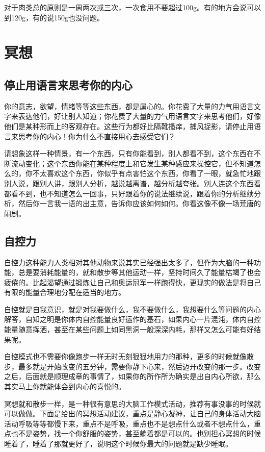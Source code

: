 \documentclass[12pt,oneside]{book}
\begin{document}
对于肉类总的原则是一周两次或三次，一次食用不要超过100g。有的地方会说可以到120g，有的说150g也没问题。


\chapter{冥想}
\section{停止用语言来思考你的内心}
你的意志，欲望，情绪等等这些东西，都是属心的。你花费了大量的力气用语言文字来表达他们，好让别人知道；你花费了大量的力气用语言文字来思考他们，好像他们是某种形而上的客观存在。这些行为都好比隔靴搔痒，捕风捉影，请停止用语言来思考你的内心！你为什么不直接用心去感受它们？

请想象这样一种情景，有一个东西，只有你能看到，别人都看不到，这个东西在不断流动变化；这个东西你能在某种程度上和它发生某种感应来操控它，但不知道怎么的，你不太喜欢这个东西，你似乎有点害怕这个东西，你看了一眼，就急忙地跟别人说，跟别人讲，跟别人分析，越说越离谱，越分析越夸张。别人连这个东西看都看不到，也不知道怎么一回事，只好跟着你的说法继续说，跟着你的分析继续分析，然后你一言我一语的出主意，告诉你应该如何如何。你看这像不像一场荒唐的闹剧。



\section{自控力}
自控力这种能力人类相对其他动物来说其实已经强出太多了，但作为大脑的一种功能，总是要消耗能量的，就和散步等其他运动一样，坚持时间久了能量枯竭了也会疲倦的。比起渴望通过锻炼让自己和奥运冠军一样跑得快，更现实的做法是将自己有限的能量合理地分配在适当的地方。

自控就是自我意识，就是对我要做什么，我不要做什么，我想要什么等问题的内心解答，自知之明是你体内自控能量良好运作的基石，如果内心一片混沌，体内自控能量随意挥洒，甚至在某些问题上如同黑洞一般深深内耗，那样又怎么可能有好结果呢。

自控模式也不需要你像跑步一样无时无刻狠狠地用力的那种，更多的时候就像散步，最多就是开始改变的五分钟，需要你静下心来，然后迈开改变的那一步。改变之后，后面就是顺理成章的事情了，如果你的所作所为确实是出自内心所欲，那么其实马上你就能体会到内心的喜悦的。

冥想就和散步一样，是一种很有意思的大脑工作模式活动，推荐有事没事的时候就可以做做。下面是\cite{自控力}给出的冥想活动建议，重点是静心凝神，让自己的身体活动大脑活动呼吸等等都慢下来，重点不是呼吸，重点也不是想点什么或者不想点什么，重点也不是姿势，找一个你舒服的姿势，甚至躺着都是可以的。也别担心冥想的时候睡着了，睡着了那就更好了，说明这个时候你最大的问题就是缺少睡眠。
\end{document}

